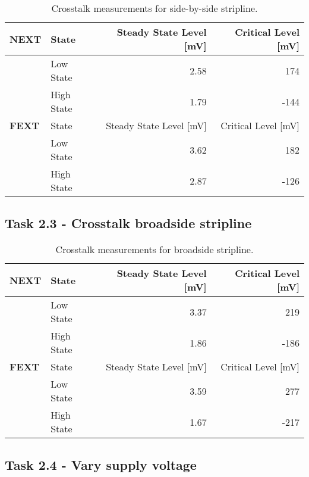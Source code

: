 \documentclass[../main.tex]{subfiles}
\begin{document}
\begin{table}[h]
    \centering
    \begin{tabular}{l l|r r}
        \toprule[1pt]
        \textbf{NEXT} & State & Steady State Level [mV] & Critical Level [mV] \\
        \midrule
        & Low State & 2.58 & 174 \\
        & High State & 1.79 & -144 \\
        \midrule[1pt]
        \textbf{FEXT} & State & Steady State Level [mV] & Critical Level [mV] \\
        \midrule
        & Low State & 3.62 & 182 \\
        & High State & 2.87 & -126 \\
        \bottomrule[1pt]
    \end{tabular}
    \caption{Crosstalk measurements for side-by-side stripline.}
    \label{tab:meas-side-by-side-stripline}
\end{table}

\newpage

\subsection{Task 2.3 - Crosstalk broadside stripline}

\begin{table}[h]
    \centering
    \begin{tabular}{l l|r r}
        \toprule[1pt]
        \textbf{NEXT} & State & Steady State Level [mV] & Critical Level [mV] \\
        \midrule
        & Low State & 3.37 & 219 \\
        & High State & 1.86 & -186 \\
        \midrule[1pt]
        \textbf{FEXT} & State & Steady State Level [mV] & Critical Level [mV] \\
        \midrule
        & Low State & 3.59 & 277 \\
        & High State & 1.67 & -217 \\
        \bottomrule[1pt]
    \end{tabular}
    \caption{Crosstalk measurements for broadside stripline.}
    \label{tab:meas-broadside-stripline}
\end{table}

\subsection{Task 2.4 - Vary supply voltage}
\end{document}
